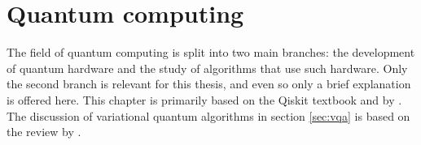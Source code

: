 \chapter{Quantum computing}
\label{chap:qc}
The field of quantum computing is split into two main branches: the development of quantum hardware and the study of algorithms that use such hardware.
Only the second branch is relevant for this thesis, and even so only a brief explanation is offered here.
This chapter is primarily based on the Qiskit textbook \cite{qiskit_textbook} and  by \textcite{textbook_2nd}.
The discussion of variational quantum algorithms in section \ref{sec:vqa} is based on the review by \textcite{cerezo2021}.









